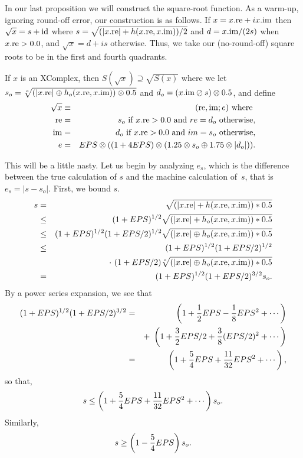 In our last proposition we will construct the square-root function.  As a warm-up, ignoring round-off error, our
construction is as follows.  If $x = x.{\rm re} + i x.{\rm im}$ then $\sqrt{x} = s + {\rm i d}$ where $s=\sqrt{(|x.{\rm
re}| + h(x.{\rm re},x.{\rm im}))/2}$ and $d = x.{\rm im}/(2s)$ when $x.{\rm re} > 0.0$, and $\sqrt{x} = d + i s$ otherwise.  
Thus, we take our (no-round-off) square roots to be in the first and fourth quadrants.

If $x$ is an {\rm XComplex,} then $S(\sqrt{x}) \supseteq \sqrt{S(x)}$
where we
let $s_o = \root o \of {(|x.{\rm re}| \oplus h_o (x.{\rm re},x.{\rm im})) \otimes 0.5}$
 and $d_o = (x.{\rm im} \oslash s) \otimes 0.5${\rm ,} and define
\begin{eqnarray*}
 \sqrt{x} & \equiv &({\rm re},{\rm im};e) \hbox{ where }\\
 {\rm re} &=& s_o \hbox{ if $x.{\rm re} > 0.0$ and $re = d_o$ otherwise},\\
{\rm im}& =& d_o \hbox{ if $x.{\rm re} > 0.0$ and $im = s_o$ otherwise},
\\
e& =& EPS \otimes ((1 + 4 EPS) \otimes (1.25 \otimes s_o \oplus 1.75 \otimes |d_o|)).
\end{eqnarray*}
\endproclaim

This will be a little nasty.  Let us begin by analyzing $e_s$, which is the difference between the true calculation of $s$ and
the machine calculation of~$s$, that is $e_s = |s - s_o|.$   First, we bound $s.$
\begin{eqnarray*}
s &=& \sqrt{(|x.{\rm re}| + h(x.{\rm re},x.{\rm im})) * 0.5}\\
&\le& (1+EPS)^{1/2} \sqrt{(|x.{\rm re}| + h_o(x.{\rm re},x.{\rm im}))
* 0.5}\\
&\le& (1+EPS)^{1/2} (1+EPS/2)^{1/2}
\sqrt{(|x.{\rm re}| \oplus h_o(x.{\rm re},x.{\rm im})) * 0.5}\\
&\le& (1+EPS)^{1/2} (1+EPS/2)^{1/2}\\
&&\cdot\ (1+EPS/2)
\root o \of {(|x.{\rm re}| \oplus h_o(x.{\rm re},x.{\rm im})) * 0.5}\\
&=& (1+EPS)^{1/2} (1+EPS/2)^{3/2} s_o.
\end{eqnarray*}
By a power series expansion, we see that
\begin{eqnarray*}
(1+EPS)^{1/2} (1+EPS/2)^{3/2}&=&\left(1 + {1 \over 2} EPS - {1 \over 8} EPS^2 + \cdots\right)\\
&& +\
     \left(1 + {3 \over 2} EPS/2 + {3 \over 8} (EPS/2)^2 +\cdots\right)\\
&=&\left(1 + {5 \over 4} EPS + {11 \over 32} EPS^2 +\cdots\right),
\end{eqnarray*}
so that,
$$s \le \left(1 + {5 \over 4} EPS + {11 \over 32} EPS^2 + \cdots\right) s_o.$$
Similarly, 
$$s \ge \left(1 - {5 \over 4} EPS\right) s_o.$$

